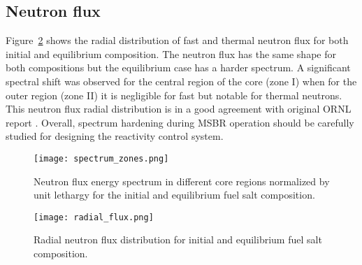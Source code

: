 \subsection{Neutron flux}
Figure~\ref{fig:radial_flux} shows the radial distribution of fast and thermal neutron flux for both initial and equilibrium composition. The neutron flux has the same shape for both compositions but the equilibrium case has a harder spectrum. A significant spectral shift was observed for the central region of the core (zone I) when for the outer region (zone II) it is negligible for fast but notable for thermal neutrons. This neutron flux radial distribution is in a good agreement with original ORNL report \cite{robertson_conceptual_1971}. Overall, spectrum hardening during \gls{MSBR} operation should be carefully studied for designing the reactivity control system.
\begin{figure}[ht!] %
  \centering
  \texttt{[image: spectrum\_zones.png]} 
  \caption{Neutron flux energy spectrum in different core regions normalized by unit lethargy for the initial and equilibrium fuel salt composition.}
  \label{fig:spectrum_zones}
\end{figure}
\begin{figure}[hb!] %
  \centering
  \texttt{[image: radial\_flux.png]} 
  \caption{Radial neutron flux distribution for initial and equilibrium fuel salt composition.}
  \label{fig:radial_flux}
\end{figure}
